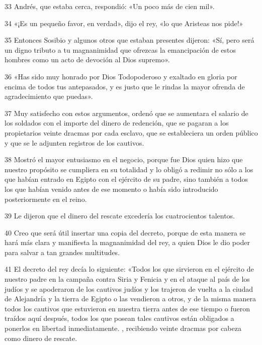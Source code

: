 \par 33 Andrés, que estaba cerca, respondió: «Un poco más de cien mil».

\par 34 «¡Es un pequeño favor, en verdad», dijo el rey, «lo que Aristeas nos pide!»

\par 35 Entonces Sosibio y algunos otros que estaban presentes dijeron: «Sí, pero será un digno tributo a tu magnanimidad que ofrezcas la emancipación de estos hombres como un acto de devoción al Dios supremo».

\par 36 «Has sido muy honrado por Dios Todopoderoso y exaltado en gloria por encima de todos tus antepasados, y es justo que le rindas la mayor ofrenda de agradecimiento que puedas».

\par 37 Muy satisfecho con estos argumentos, ordenó que se aumentara el salario de los soldados con el importe del dinero de redención, que se pagaran a los propietarios veinte dracmas por cada esclavo, que se estableciera un orden público y que se le adjunten registros de los cautivos.

\par 38 Mostró el mayor entusiasmo en el negocio, porque fue Dios quien hizo que nuestro propósito se cumpliera en su totalidad y lo obligó a redimir no sólo a los que habían entrado en Egipto con el ejército de su padre, sino también a todos los que habían venido antes de ese momento o había sido introducido posteriormente en el reino.

\par 39 Le dijeron que el dinero del rescate excedería los cuatrocientos talentos.

\par 40 Creo que será útil insertar una copia del decreto, porque de esta manera se hará más clara y manifiesta la magnanimidad del rey, a quien Dios le dio poder para salvar a tan grandes multitudes.

\par 41 El decreto del rey decía lo siguiente: «Todos los que sirvieron en el ejército de nuestro padre en la campaña contra Siria y Fenicia y en el ataque al país de los judíos y se apoderaron de los cautivos judíos y los trajeron de vuelta a la ciudad de Alejandría y la tierra de Egipto o las vendieron a otros, y de la misma manera todos los cautivos que estuvieron en nuestra tierra antes de ese tiempo o fueron traídos aquí después, todos los que posean tales cautivos están obligados a ponerlos en libertad inmediatamente. , recibiendo veinte dracmas por cabeza como dinero de rescate.

